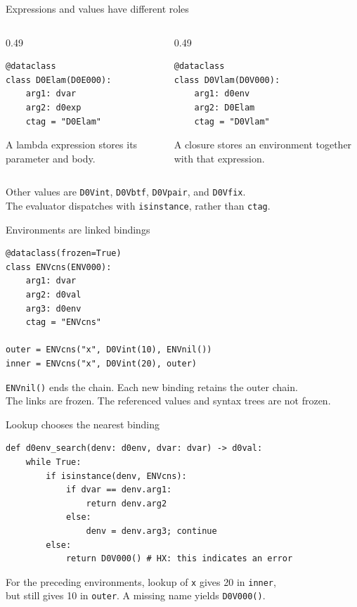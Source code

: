 \documentclass[aspectratio=169,11pt]{beamer}
\begin{document}
\begin{frame}[fragile]{Expressions and values have different roles}
\begin{columns}[T]
\begin{column}{0.49\textwidth}
\begin{lstlisting}
@dataclass
class D0Elam(D0E000):
    arg1: dvar
    arg2: d0exp
    ctag = "D0Elam"
\end{lstlisting}
\medskip
A lambda expression stores its parameter and body.
\end{column}
\begin{column}{0.49\textwidth}
\begin{lstlisting}
@dataclass
class D0Vlam(D0V000):
    arg1: d0env
    arg2: D0Elam
    ctag = "D0Vlam"
\end{lstlisting}
\medskip
A closure stores an environment together with that expression.
\end{column}
\end{columns}
\bigskip
Other values are \texttt{D0Vint}, \texttt{D0Vbtf}, \texttt{D0Vpair}, and \texttt{D0Vfix}.\\[0.6em]
The evaluator dispatches with \texttt{isinstance}, rather than \texttt{ctag}.
\end{frame}

\begin{frame}[fragile]{Environments are linked bindings}
\begin{lstlisting}
@dataclass(frozen=True)
class ENVcns(ENV000):
    arg1: dvar
    arg2: d0val
    arg3: d0env
    ctag = "ENVcns"

outer = ENVcns("x", D0Vint(10), ENVnil())
inner = ENVcns("x", D0Vint(20), outer)
\end{lstlisting}
\medskip
\texttt{ENVnil()} ends the chain. Each new binding retains the outer chain.\\[0.6em]
The links are frozen. The referenced values and syntax trees are not frozen.
\end{frame}

\begin{frame}[fragile]{Lookup chooses the nearest binding}
\begin{lstlisting}
def d0env_search(denv: d0env, dvar: dvar) -> d0val:
    while True:
        if isinstance(denv, ENVcns):
            if dvar == denv.arg1:
                return denv.arg2
            else:
                denv = denv.arg3; continue
        else:
            return D0V000() # HX: this indicates an error
\end{lstlisting}
\medskip
For the preceding environments, lookup of \texttt{x} gives 20 in \texttt{inner},\\
but still gives 10 in \texttt{outer}. A missing name yields \texttt{D0V000()}.
\end{frame}
\end{document}
